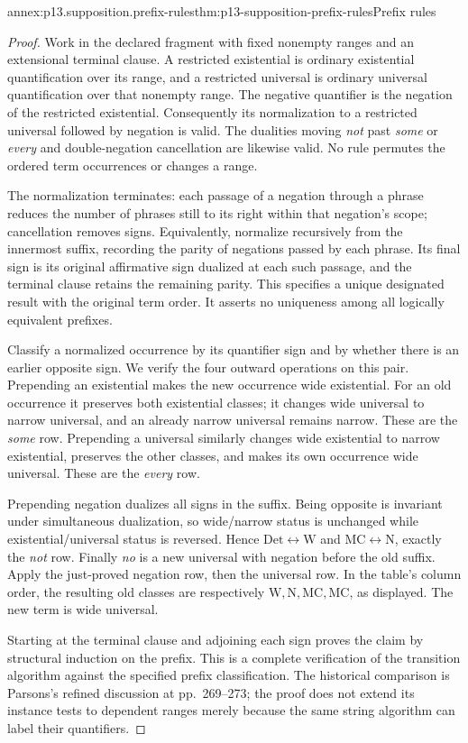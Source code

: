 \begin{annexitem}{annex:p13.supposition.prefix-rules}{thm:p13-supposition-prefix-rules}{Prefix rules}
\begin{proof}
Work in the declared fragment with fixed nonempty ranges and an
extensional terminal clause. A restricted existential is ordinary
existential quantification over its range, and a restricted universal
is ordinary universal quantification over that nonempty range. The
negative quantifier is the negation of the restricted existential.
Consequently its normalization to a restricted universal followed by
negation is valid. The dualities moving \emph{not} past \emph{some}
or \emph{every} and double-negation cancellation are likewise valid.
No rule permutes the ordered term occurrences or changes a range.

The normalization terminates: each passage of a negation through a
phrase reduces the number of phrases still to its right within that
negation's scope; cancellation removes signs. Equivalently, normalize
recursively from the innermost suffix, recording the parity of negations
passed by each phrase. Its final sign is its original affirmative sign
dualized at each such passage, and the terminal clause retains the
remaining parity. This specifies a unique designated result with the
original term order. It asserts no uniqueness among all logically
equivalent prefixes.

Classify a normalized occurrence by its quantifier sign and by whether
there is an earlier opposite sign. We verify the four outward operations
on this pair. Prepending an existential makes the new occurrence wide
existential. For an old occurrence it preserves both existential
classes; it changes wide universal to narrow universal, and an already
narrow universal remains narrow. These are the \emph{some} row.
Prepending a universal similarly changes wide existential to narrow
existential, preserves the other classes, and makes its own occurrence
wide universal. These are the \emph{every} row.

Prepending negation dualizes all signs in the suffix. Being opposite
is invariant under simultaneous dualization, so wide/narrow status is
unchanged while existential/universal status is reversed. Hence
\(\mathrm{Det}\leftrightarrow\mathrm W\) and
\(\mathrm{MC}\leftrightarrow\mathrm N\), exactly the \emph{not}
row. Finally \emph{no} is a new universal with negation before the
old suffix. Apply the just-proved negation row, then the universal row.
In the table's column order, the resulting old classes are respectively
\(\mathrm W,\mathrm N,\mathrm{MC},\mathrm{MC}\), as displayed.
The new term is wide universal.

Starting at the terminal clause and adjoining each sign proves the
claim by structural induction on the prefix. This is a complete
verification of the transition algorithm against the specified prefix
classification. The historical comparison is Parsons's refined
discussion at pp.~269--273; the proof does not extend its instance
tests to dependent ranges merely because the same string algorithm
can label their quantifiers.
\end{proof}
\end{annexitem}

